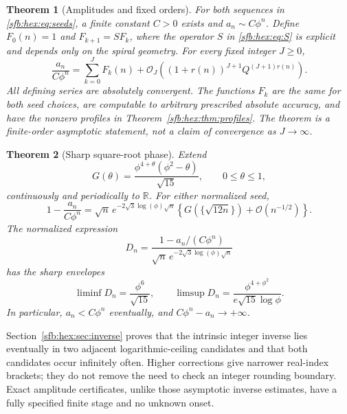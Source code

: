 \documentclass[11pt]{article}
\newtheorem{theorem}{Theorem}[section]
\theoremstyle{remark}\newtheorem{remark}[theorem]{Remark}
\newcommand{\OO}{\mathcal O}
\newcommand{\R}{\mathbb R}
\begin{document}
\begin{theorem}[Amplitudes and fixed orders]\label{sfb:hex:thm:main}
For both sequences in \eqref{sfb:hex:eq:seeds}, a finite constant $C>0$ exists and $a_n\sim C\phi^n$. Define $F_0(n)=1$ and $F_{k+1}=SF_k$, where the operator $S$ in \eqref{sfb:hex:eq:S} is explicit and depends only on the spiral geometry. For every fixed integer $J\ge0$,
\begin{equation}\label{sfb:hex:eq:allorder}
 \frac{a_n}{C\phi^n}
 =\sum_{k=0}^J F_k(n)
  +\OO_J\!\left((1+r(n))^{J+1}Q^{(J+1)r(n)}\right).
\end{equation}
All defining series are absolutely convergent. The functions $F_k$ are the same for both seed choices, are computable to arbitrary prescribed absolute accuracy, and have the nonzero profiles in Theorem~\ref{sfb:hex:thm:profiles}. The theorem is a finite-order asymptotic statement, not a claim of convergence as $J\to\infty$.
\end{theorem}

\begin{theorem}[Sharp square-root phase]\label{sfb:hex:thm:phaseintro}
Extend
\begin{equation}\label{sfb:hex:eq:G}
 G(\theta)=\frac{\phi^{4+\theta}(\phi^2-\theta)}{\sqrt{15}},
 \qquad 0\le\theta\le1,
\end{equation}
continuously and periodically to $\R$. For either normalized seed,
\begin{equation}\label{sfb:hex:eq:phase}
 1-\frac{a_n}{C\phi^n}
 =\sqrt n\,e^{-2\sqrt3\log(\phi)\sqrt n}
   \left\{G(\{\sqrt{12n}\})+\OO(n^{-1/2})\right\}.
\end{equation}
The normalized expression
\[
 D_n=\frac{1-a_n/(C\phi^n)}{\sqrt n\,e^{-2\sqrt3\log(\phi)\sqrt n}}
\]
has the sharp envelopes
\begin{equation}\label{sfb:hex:eq:envelopes}
 \liminf D_n=\frac{\phi^6}{\sqrt{15}},\qquad
 \limsup D_n=\frac{\phi^{4+\phi^2}}{e\sqrt{15}\log\phi}.
\end{equation}
In particular, $a_n<C\phi^n$ eventually, and $C\phi^n-a_n\to+\infty$.
\end{theorem}

Section~\ref{sfb:hex:sec:inverse} proves that the intrinsic integer inverse lies eventually in two adjacent logarithmic-ceiling candidates and that both candidates occur infinitely often. Higher corrections give narrower real-index brackets; they do not remove the need to check an integer rounding boundary. Exact amplitude certificates, unlike those asymptotic inverse estimates, have a fully specified finite stage and no unknown onset.
\end{document}
